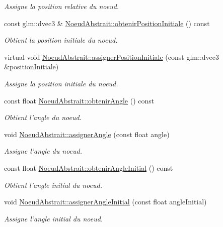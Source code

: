 \begin{DoxyCompactItemize}
\begin{DoxyCompactList}\small\item\em Assigne la position relative du noeud. \end{DoxyCompactList}\item 
const glm\-::dvec3 \& \hyperlink{group__inf2990_ga5e57e4e6ac1df01d25098fbeb7fcc56d}{Noeud\-Abstrait\-::obtenir\-Position\-Initiale} () const 
\begin{DoxyCompactList}\small\item\em Obtient la position initiale du noeud. \end{DoxyCompactList}\item 
virtual void \hyperlink{group__inf2990_ga18ba04a32eaa8942418950a647e5e717}{Noeud\-Abstrait\-::assigner\-Position\-Initiale} (const glm\-::dvec3 \&position\-Initiale)
\begin{DoxyCompactList}\small\item\em Assigne la position initiale du noeud. \end{DoxyCompactList}\item 
const float \hyperlink{group__inf2990_ga9f5f0864e56b552efe95e693c198a3b4}{Noeud\-Abstrait\-::obtenir\-Angle} () const 
\begin{DoxyCompactList}\small\item\em Obtient l'angle du noeud. \end{DoxyCompactList}\item 
void \hyperlink{group__inf2990_ga7977957d758ca590a057aa33d76e5e75}{Noeud\-Abstrait\-::assigner\-Angle} (const float angle)
\begin{DoxyCompactList}\small\item\em Assigne l'angle du noeud. \end{DoxyCompactList}\item 
const float \hyperlink{group__inf2990_ga61797fb6a426150891203ea91e3f2cb8}{Noeud\-Abstrait\-::obtenir\-Angle\-Initial} () const 
\begin{DoxyCompactList}\small\item\em Obtient l'angle initial du noeud. \end{DoxyCompactList}\item 
void \hyperlink{group__inf2990_gaf0e7fd3676087b70949012a945000509}{Noeud\-Abstrait\-::assigner\-Angle\-Initial} (const float angle\-Initial)
\begin{DoxyCompactList}\small\item\em Assigne l'angle initial du noeud. \end{DoxyCompactList}\item 

\end{DoxyCompactItemize}

